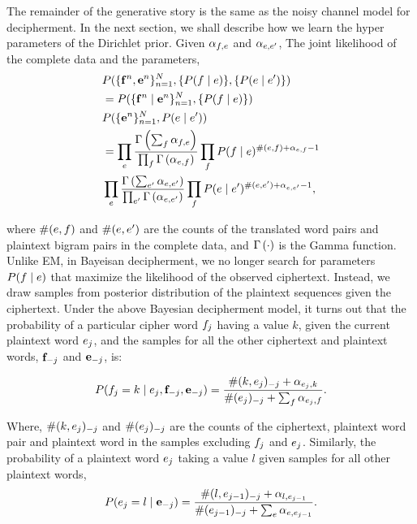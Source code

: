 The remainder of the generative story is the same as the noisy channel model for decipherment. In the next section, we shall describe how we learn the hyper parameters of the Dirichlet prior. Given $\alpha_{f,e}$ and $\alpha_{e,e'}$, The joint likelihood of the complete data and the parameters,
\begin{align} \label{joint_likelihood}
&P( \{ \mathbf{f}^n , \mathbf{e}^n \}_{n=1}^{N}, \{ P(f \mid e) \}, \{ P(e \mid e') \} )  \notag \\
 &= P( \{ \mathbf{f}^n \mid \mathbf{e}^n \}_{n=1}^{N}, \{ P(f \mid e) \}) \notag \\
     &P(  \{  \mathbf{e}^n \}_{n=1}^{N},P(e \mid e')) \notag \notag \\
 &= \prod_{e}  \frac{\Gamma \left( \sum_{f} \alpha_{f,e} \right)} {\prod_{f} \Gamma \left( \alpha_{e,f} \right)} \prod_{f} P(f \mid e)^{\#(e,f)+\alpha_{e,f} -1}  \notag \\
  &\prod_{e}  \frac{\Gamma \left( \sum_{e'} \alpha_{e,e'} \right)} {\prod_{e'} \Gamma \left( \alpha_{e,e'} \right)} \prod_{f} P(e \mid e')^{\#(e,e')+\alpha_{e,e'} -1} , 
\end{align}

where $\#(e,f)$ and $\#(e,e')$ are the counts of the translated word pairs and plaintext bigram pairs in the complete data, and $\Gamma \left( \cdot \right)$ is the Gamma function. Unlike EM, in Bayeisan decipherment, we no longer search for parameters $P(f \mid e)$ that maximize the likelihood of the observed ciphertext. Instead, we draw samples from posterior distribution of the plaintext sequences given the ciphertext. Under the above Bayesian decipherment model, it turns out  that the probability of a particular cipher word $f_{j}$ having a value $k$, given the current plaintext word $e_j$, and  the samples for all the other ciphertext and plaintext words, $\mathbf{f}_{-j}$ and $\mathbf{e}_{-j}$, is:

\begin{equation} \label{prob_bayes_ciphertext}
P(f_j = k \mid e_j,\mathbf{f}_{-j}, \mathbf{e}_{-j}) = \frac{\#(k, e_j)_{-j} + \alpha_{e_j,k}}{\#(e_j)_{-j}+\sum_{f} \alpha_{e_j,f}}.
\end{equation}

Where, $\#(k, e_j)_{-j}$ and $\#(e_j)_{-j}$ are the counts of the ciphertext, plaintext word pair and plaintext word in the samples excluding $f_j$ and $e_j$. Similarly, the probability of a plaintext word $e_j$ taking a value $l$ given samples for all other plaintext words, 
\begin{equation} \label{prob_bayes_plaintext}
P(e_j = l \mid \mathbf{e}_{-j}) = \frac{\#(l, e_{j-1})_{-j} + \alpha_{l,e_{j-1}}} {\#(e_{j-1})_{-j} + \sum_{e} \alpha_{e,e_{j-1}}}.
\end{equation}


